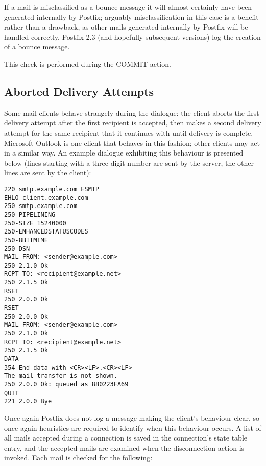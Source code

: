 If a mail is misclassified as a bounce message it will almost certainly
have been generated internally by Postfix; arguably misclassification in
this case is a benefit rather than a drawback, as other mails generated
internally by Postfix will be handled correctly.  Postfix 2.3 (and
hopefully subsequent versions) log the creation of a bounce message.

This check is performed during the COMMIT action.

\subsection{Aborted Delivery Attempts}

\label{aborted delivery attempts}

Some mail clients behave strangely during the  dialogue: the
client aborts the first delivery attempt after the first recipient is
accepted, then makes a second delivery attempt for the same recipient that
it continues with until delivery is complete.  Microsoft Outlook is one
client that behaves in this fashion; other clients may act in a similar
way.  An example dialogue exhibiting this behaviour is presented below
(lines starting with a three digit number are sent by the server, the other
lines are sent by the client):

\begin{verbatim}
220 smtp.example.com ESMTP
EHLO client.example.com
250-smtp.example.com
250-PIPELINING
250-SIZE 15240000
250-ENHANCEDSTATUSCODES
250-8BITMIME
250 DSN
MAIL FROM: <sender@example.com>
250 2.1.0 Ok
RCPT TO: <recipient@example.net>
250 2.1.5 Ok
RSET
250 2.0.0 Ok
RSET
250 2.0.0 Ok
MAIL FROM: <sender@example.com>
250 2.1.0 Ok
RCPT TO: <recipient@example.net>
250 2.1.5 Ok
DATA
354 End data with <CR><LF>.<CR><LF>
The mail transfer is not shown.
250 2.0.0 Ok: queued as 880223FA69
QUIT
221 2.0.0 Bye
\end{verbatim}

Once again Postfix does not log a message making the client's behaviour
clear, so once again heuristics are required to identify when this
behaviour occurs.  A list of all mails accepted during a connection is
saved in the connection's state table entry, and the accepted mails are
examined when the disconnection action is invoked.  Each mail is checked
for the following:

